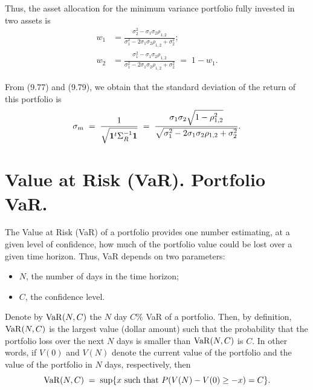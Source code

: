 
Thus, the asset allocation for the minimum variance portfolio fully invested in two
assets is
\begin{align}
w_1 &= \frac{\sigma_2^2-\sigma_1\sigma_2\rho_{1,2}}{\sigma_1^2-2\sigma_1\sigma_2
\rho_{1,2}+\sigma_2^2}; \\
w_2 &= \frac{\sigma_1^2-\sigma_1\sigma_2\rho_{1,2}}{\sigma_1^2-2\sigma_1\sigma_2
\rho_{1,2}+\sigma_2^2} \;=\; 1-w_1.
\end{align}

From (9.77) and (9.79), we obtain that the standard deviation of the return of this
portfolio is
\begin{equation}
\sigma_m \;=\; \frac{1}{\sqrt{\mathbf{1}^t\Sigma_R^{-1}\mathbf{1}}} \;=\;
\frac{\sigma_1\sigma_2\sqrt{1-\rho_{1,2}^2}}{\sqrt{\sigma_1^2-2\sigma_1\sigma_2
\rho_{1,2}+\sigma_2^2}}.
\end{equation}

\section{Value at Risk (VaR). Portfolio VaR.}

The Value at Risk (VaR) of a portfolio provides one number estimating, at a given
level of confidence, how much of the portfolio value could be lost over a given time
horizon. Thus, VaR depends on two parameters:
\begin{itemize}
\item $N$, the number of days in the time horizon;
\item $C$, the confidence level.
\end{itemize}

Denote by $\operatorname{VaR}(N,C)$ the $N$ day $C\%$ VaR of a portfolio. Then, by definition,
$\operatorname{VaR}(N,C)$ is the largest value (dollar amount) such that the probability that the
portfolio loss over the next $N$ days is smaller than $\operatorname{VaR}(N,C)$ is $C$. In other
words, if $V(0)$ and $V(N)$ denote the current value of the portfolio and the value of
the portfolio in $N$ days, respectively, then
\begin{equation}
\operatorname{VaR}(N,C) \;=\; \sup\{x \text{ such that } P(V(N)-V(0)\ge -x)=C\}.
\end{equation}

